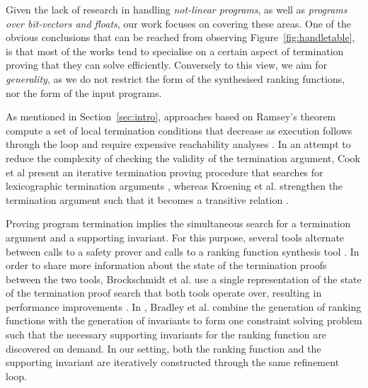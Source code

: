 \documentclass[preprint]{sigplanconf}
\theoremstyle{definition}
\begin{document}
Given the lack of research in handling \emph{not-linear programs}, as well as \emph{programs over bit-vectors and floats},  
our work focuses on covering these areas. 
One of the obvious conclusions that can be reached from observing Figure~\ref{fig:handletable}, 
is that most of the works tend to specialise on a certain aspect of termination proving that they can solve efficiently. 
Conversely to this view, we aim for \emph{generality}, as we do not restrict the form of the synthesised ranking functions, nor the form of the input programs.


As mentioned in Section~\ref{sec:intro}, approaches based on Ramsey's theorem compute a set of local termination conditions that decrease as execution follows through the loop
and require expensive reachability analyses
\cite{DBLP:conf/lpe/CodishG03,DBLP:conf/lics/PodelskiR04,DBLP:conf/pldi/CookPR06}.
In an attempt to reduce the complexity of checking the validity of the termination argument, 
Cook et al present an iterative termination proving procedure that searches for 
lexicographic termination arguments \cite{DBLP:conf/tacas/CookSZ13}, 
whereas Kroening et al. strengthen the termination argument such that it becomes a transitive relation \cite{DBLP:conf/cav/KroeningSTW10}.

Proving program termination implies the simultaneous search for a termination argument and a supporting invariant.
For this purpose, several tools alternate 
between calls to a safety prover and calls to a ranking function synthesis tool \cite{}. 
In order to share more information about the state of the termination proofs between the two tools, 
Brockschmidt et al. use a single representation of the state of the termination proof search that both tools operate over, 
resulting in performance improvements \cite{DBLP:conf/cav/BrockschmidtCF13}.
In \cite{DBLP:conf/cav/BradleyMS05}, Bradley et al. combine the generation of ranking functions with the generation of invariants to
form one constraint solving problem such that the necessary supporting invariants for the ranking function are discovered on demand.
In our setting, both the ranking function and the supporting invariant are iteratively constructed through the same refinement loop.

 

\end{document}
